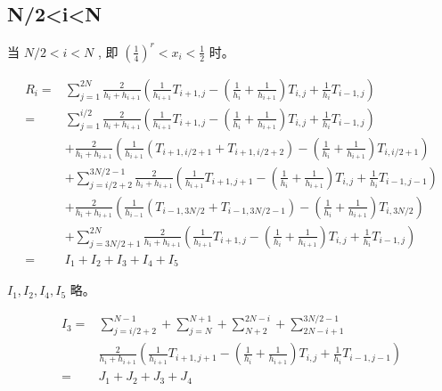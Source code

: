 \documentclass{ctexart}
\theoremstyle{definition}
\theoremstyle{remark}
\numberwithin{equation}{section}
\begin{document}
\subsection{N/2<i<N}

当 \(N/2<i<N\) , 即 \((\frac{1}{4})^r<x_i<\frac{1}{2}\) 时。


\begin{equation}
    \begin{aligned}
        R_i
        = & \sum_{j=1}^{2N} \frac{2}{h_i + h_{i+1}}
        \left( \frac{1}{h_{i+1}} T_{i+1, j}
        - (\frac{1}{h_{i}}+\frac{1}{h_{i+1}}) T_{i,j}
        +  \frac{1}{h_{i}} T_{i-1, j} \right)                     \\
        = & \sum_{j=1}^{i/2} \frac{2}{h_i + h_{i+1}}
        \left( \frac{1}{h_{i+1}} T_{i+1, j}
        - (\frac{1}{h_{i}}+\frac{1}{h_{i+1}}) T_{i,j}
        +  \frac{1}{h_{i}} T_{i-1, j} \right)                     \\
          & + \frac{2}{h_i + h_{i+1}}
        \left( \frac{1}{h_{i+1}} (T_{i+1, i/2+1} +  T_{i+1, i/2+2})
        - (\frac{1}{h_{i}}+\frac{1}{h_{i+1}}) T_{i,i/2+1} \right) \\
          & + \sum_{j=i/2+2}^{3N/2-1} \frac{2}{h_i + h_{i+1}}
        \left( \frac{1}{h_{i+1}} T_{i+1, j+1}
        - (\frac{1}{h_{i}}+\frac{1}{h_{i+1}}) T_{i,j}
        +  \frac{1}{h_{i}} T_{i-1, j-1} \right)                   \\
          & + \frac{2}{h_i + h_{i+1}}
        \left( \frac{1}{h_{i-1}} (T_{i-1, 3N/2} +  T_{i-1, 3N/2-1})
        - (\frac{1}{h_{i}}+\frac{1}{h_{i+1}}) T_{i,3N/2} \right)  \\
          & + \sum_{j=3N/2+1}^{2N} \frac{2}{h_i + h_{i+1}}
        \left( \frac{1}{h_{i+1}} T_{i+1, j}
        - (\frac{1}{h_{i}}+\frac{1}{h_{i+1}}) T_{i,j}
        +  \frac{1}{h_{i}} T_{i-1, j} \right)                     \\
        = & I_1 + I_2 + I_3 + I_4 + I_5
    \end{aligned}
\end{equation}

\(I_1, I_2, I_4, I_5\) 略。

\begin{equation}
    \begin{aligned}
        I_3 = & \sum_{j=i/2+2}^{N-1}  + \sum_{j=N}^{N+1} + \sum_{N+2}^{2N-i} + \sum_{2N-i+1}^{3N/2-1} \\
              & \frac{2}{h_i + h_{i+1}}
        \left( \frac{1}{h_{i+1}} T_{i+1, j+1}
        - (\frac{1}{h_{i}}+\frac{1}{h_{i+1}}) T_{i,j}
        +  \frac{1}{h_{i}} T_{i-1, j-1} \right)                                                       \\
        =     & J_1 + J_2 + J_3 + J_4
    \end{aligned}
\end{equation}
\end{document}
